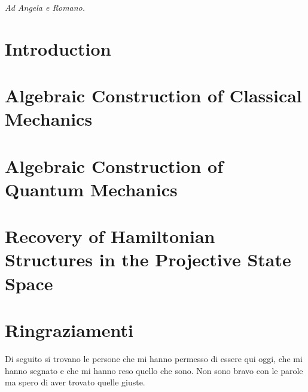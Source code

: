 



\frontmatter



\cleardoublepage
\thispagestyle{empty}
\vspace*{0.2\textheight}
\begin{flushright}
	\textit{Ad Angela e Romano.}
\end{flushright}
\vfill
\cleardoublepage


\tableofcontents

\setlength{\headwidth}{\textwidth}

\mainmatter
\chapter*{Introduction}

\chapter{Algebraic Construction of Classical Mechanics}\label{cap:cm-c-star}




\chapter{Algebraic Construction of Quantum Mechanics}\label{cap:qm-algebraic}



\chapter{Recovery of Hamiltonian Structures in the Projective State Space}\label{cap:kahler}




\backmatter
\printbibliography

\chapter*{Ringraziamenti}
Di seguito si trovano le persone che mi hanno permesso di essere qui oggi, che mi hanno segnato e che mi hanno reso quello che sono. Non sono bravo con le parole ma spero di aver trovato quelle giuste.

